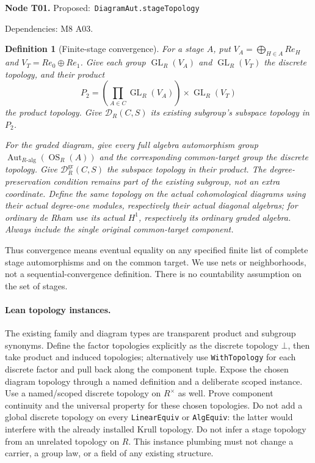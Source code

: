\documentclass[11pt]{article}
\newtheorem{definition}[theorem]{Definition}
\theoremstyle{remark}\newtheorem{remark}[theorem]{Remark}
\newcommand{\OS}{\operatorname{OS}}
\newcommand{\Aut}{\operatorname{Aut}}
\newcommand{\GL}{\operatorname{GL}}
\newcommand{\D}{\mathcal D}
\newcommand{\DG}{\mathcal D^{\mathrm{gr}}}
\newcommand{\code}[1]{{\normalfont\nolinkurl{#1}}}
\newcommand{\node}[3]{\par\Needspace{8\baselineskip}\smallskip\noindent\textbf{Node #1.}\quad
 \textsf{Proposed:}\ \code{#2}\par\noindent
 \textsf{Dependencies:} #3.\par\smallskip}
\begin{document}
\node{T01}{DiagramAut.stageTopology}{M8 A03}
\begin{definition}[Finite-stage convergence]\label{def:t01}
For a stage $A$, put $V_A=\bigoplus_{H\in A}R e_H$ and
$V_T=R e_0\oplus R e_1$. Give each group $\GL_R(V_A)$ and
$\GL_R(V_T)$ the discrete topology, and their product
\[
       P_2=\left(\prod_{A\in C}\GL_R(V_A)\right)\times\GL_R(V_T)
\]
the product topology. Give $\D_R(C,S)$ its existing subgroup's
subspace topology in $P_2$.

For the graded diagram, give every full algebra automorphism group
$\Aut_{R\text{-alg}}(\OS_R(A))$ and the corresponding common-target
group the discrete topology. Give $\DG_R(C,S)$ the subspace topology
in their product. The degree-preservation condition remains part of
the existing subgroup, not an extra coordinate. Define the same topology
on the actual cohomological diagrams using their actual degree-one
modules, respectively their actual diagonal algebras; for ordinary
de Rham use its actual $H^1$, respectively its ordinary graded algebra.
Always include the single original common-target component.
\end{definition}

Thus convergence means eventual equality on any specified finite list
of complete stage automorphisms and on the common target. We use nets
or neighborhoods, not a sequential-convergence definition. There is no
countability assumption on the set of stages.

\paragraph{Lean topology instances.}
The existing family and diagram types are transparent product and subgroup
synonyms. Define the factor topologies explicitly as the discrete topology
$\bot$, then take product and induced topologies; alternatively use
\code{WithTopology} for each discrete factor and pull back along the
component tuple. Expose the chosen diagram topology through a named
definition and a deliberate scoped instance. Use a named/scoped discrete
topology on $R^\times$ as well. Prove component continuity and the
universal property for these chosen topologies. Do not add a global
discrete topology on every \code{LinearEquiv} or \code{AlgEquiv}:
the latter would interfere with the already installed Krull topology.
Do not infer a stage topology from an unrelated topology on $R$.
This instance plumbing must not change a carrier, a group law, or a
field of any existing structure.
\end{document}

